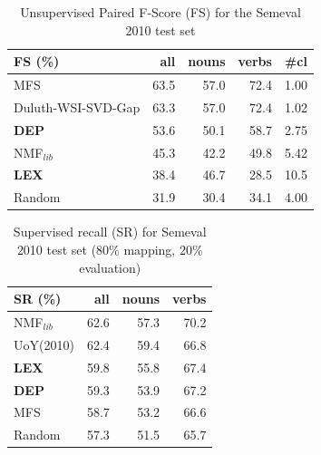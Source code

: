 \begin{table}[]
\centering

\begin{tabular}{@{}lrrrr@{}}
\toprule
\textbf{FS (\%)} & \textbf{all} & \textbf{nouns} & \textbf{verbs} & \textbf{\#cl} \\ \midrule
MFS & 63.5 & 57.0 & 72.4 & 1.00 \\
Duluth-WSI-SVD-Gap & 63.3 & 57.0 & 72.4 & 1.02 \\
\textbf{DEP} & 53.6 & 50.1 & 58.7 & 2.75 \\
NMF$_{lib}$&45.3&42.2&49.8&5.42\\
\textbf{LEX} & 38.4 & 46.7 & 28.5 & 10.5 \\
Random & 31.9 & 30.4 & 34.1 & 4.00 \\ \bottomrule
\end{tabular}
\caption{Unsupervised Paired F-Score (FS) for the Semeval 2010 test set}
\label{tab:sem2010_FS}
\end{table}


\begin{table}[h!]
\centering

\begin{tabular}{@{}lrrr@{}}
\toprule
\textbf{SR (\%)} & \textbf{all} & \textbf{nouns} & \textbf{verbs} \\ \midrule
NMF$_{lib}$&62.6&57.3&70.2\\
UoY(2010) & 62.4 & 59.4 & 66.8 \\

\textbf{LEX} & 59.8 & 55.8 & 67.4 \\
\textbf{DEP} & 59.3 & 53.9 & 67.2 \\
MFS & 58.7 & 53.2 & 66.6 \\
Random & 57.3 & 51.5 & 65.7 \\ \bottomrule

\end{tabular}

\caption{Supervised recall (SR) for Semeval 2010 test set (80\% mapping, 20\% evaluation)}
\label{tab:sem2010_SR}
\end{table}




